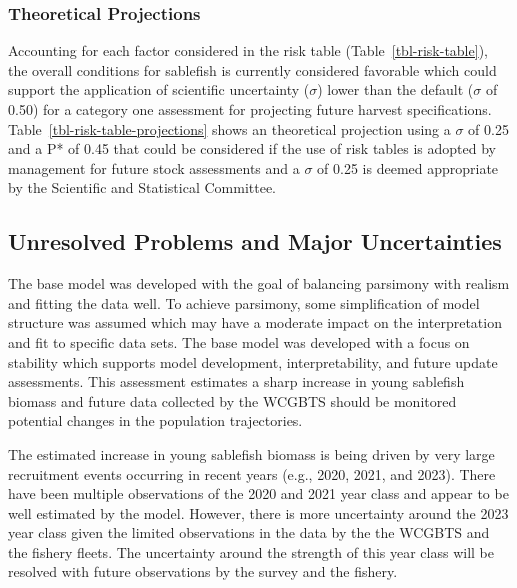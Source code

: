 \documentclass[
  english,
]{article}
\begin{document}
\subsubsection{Theoretical Projections}\label{theoretical-projections}

Accounting for each factor considered in the risk table
(Table~\ref{tbl-risk-table}), the overall conditions for sablefish is
currently considered favorable which could support the application of
scientific uncertainty (\(\sigma\)) lower than the default (\(\sigma\)
of 0.50) for a category one assessment for projecting future harvest
specifications. Table~\ref{tbl-risk-table-projections} shows an
theoretical projection using a \(\sigma\) of 0.25 and a P* of 0.45 that
could be considered if the use of risk tables is adopted by management
for future stock assessments and a \(\sigma\) of 0.25 is deemed
appropriate by the Scientific and Statistical Committee.

\subsection{Unresolved Problems and Major
Uncertainties}\label{unresolved-problems-and-major-uncertainties-1}

The base model was developed with the goal of balancing parsimony with
realism and fitting the data well. To achieve parsimony, some
simplification of model structure was assumed which may have a moderate
impact on the interpretation and fit to specific data sets. The base
model was developed with a focus on stability which supports model
development, interpretability, and future update assessments. This
assessment estimates a sharp increase in young sablefish biomass and
future data collected by the WCGBTS should be monitored potential
changes in the population trajectories.

The estimated increase in young sablefish biomass is being driven by
very large recruitment events occurring in recent years (e.g., 2020,
2021, and 2023). There have been multiple observations of the 2020 and
2021 year class and appear to be well estimated by the model. However,
there is more uncertainty around the 2023 year class given the limited
observations in the data by the the WCGBTS and the fishery fleets. The
uncertainty around the strength of this year class will be resolved with
future observations by the survey and the fishery.
\end{document}
